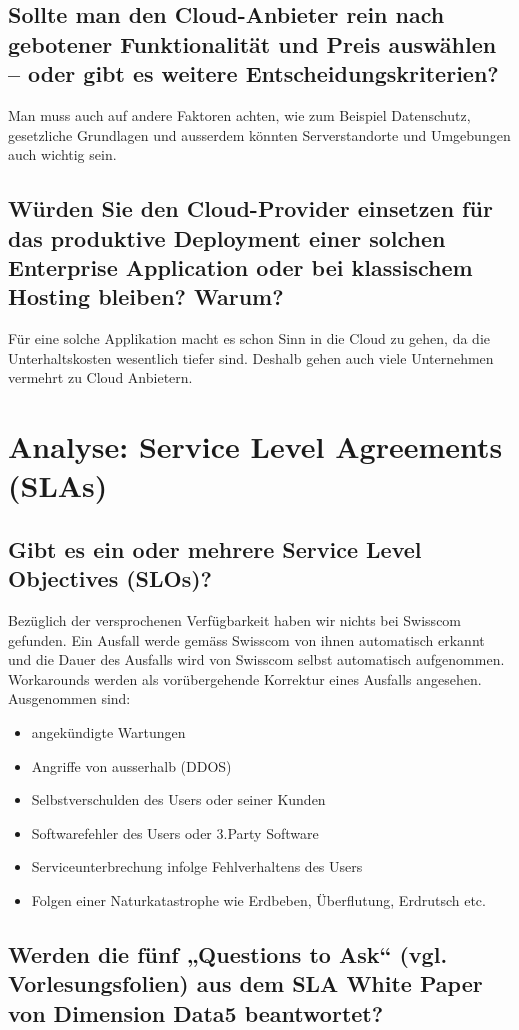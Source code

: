\documentclass[11pt,titlepage]{article}
\begin{document}
\subsection{Sollte man den Cloud-Anbieter rein nach gebotener Funktionalität und Preis auswählen – oder gibt es weitere Entscheidungskriterien?}
Man muss auch auf andere Faktoren achten, wie zum Beispiel Datenschutz, gesetzliche Grundlagen und ausserdem könnten Serverstandorte und Umgebungen auch wichtig sein.
\subsection{Würden Sie den Cloud-Provider einsetzen für das produktive Deployment einer solchen Enterprise Application oder bei klassischem Hosting bleiben? Warum?}
Für eine solche Applikation macht es schon Sinn in die Cloud zu gehen, da die Unterhaltskosten wesentlich tiefer sind. Deshalb gehen auch viele Unternehmen vermehrt zu Cloud Anbietern.

\section{Analyse: Service Level Agreements (SLAs)}
\label{sec:analyseSLAs}
\subsection{Gibt es ein oder mehrere Service Level Objectives (SLOs)?}
Bezüglich der versprochenen Verfügbarkeit haben wir nichts bei Swisscom gefunden. Ein Ausfall werde gemäss Swisscom von ihnen automatisch erkannt und die Dauer des Ausfalls wird von Swisscom selbst automatisch aufgenommen. Workarounds werden als vorübergehende Korrektur eines Ausfalls angesehen.
Ausgenommen sind:
\begin{itemize}
	\item angekündigte Wartungen
	\item Angriffe von ausserhalb (DDOS)
	\item Selbstverschulden des Users oder seiner Kunden
	\item Softwarefehler des Users oder 3.Party Software
	\item Serviceunterbrechung infolge Fehlverhaltens des Users
	\item Folgen einer Naturkatastrophe wie Erdbeben, Überflutung, Erdrutsch etc.
\end{itemize}
\subsection{Werden die fünf „Questions to Ask“ (vgl. Vorlesungsfolien) aus dem SLA White Paper von Dimension Data5 beantwortet?}
\end{document}
